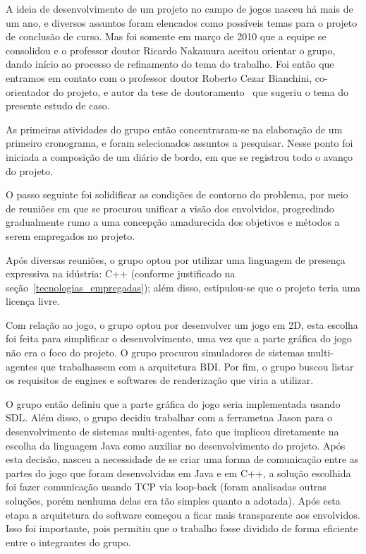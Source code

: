 A ideia de desenvolvimento de um projeto no campo de jogos nasceu há mais de um ano, e diversos assuntos foram elencados como possíveis temas para o projeto de conclusão de curso. Mas foi somente em março de 2010 que a equipe se consolidou e o professor doutor Ricardo Nakamura aceitou orientar o grupo, dando início ao processo de refinamento do tema do trabalho. Foi então que entramos em contato com o professor doutor Roberto Cezar Bianchini, co-orientador do projeto, e autor da tese de doutoramento~\cite{tese_roberto} que sugeriu o tema do presente estudo de caso.  

As primeiras atividades do grupo então concentraram-se na elaboração de um primeiro cronograma, e foram selecionados assuntos a pesquisar. Nesse ponto foi iniciada a composição de um diário de bordo, em que se registrou todo o avanço do projeto.

O passo seguinte foi solidificar as condições de contorno do problema, por meio de reuniões em que se procurou unificar a visão dos envolvidos, progredindo gradualmente rumo a uma concepção amadurecida dos objetivos e métodos a serem empregados no projeto.

Após diversas reuniões, o grupo optou por utilizar uma linguagem de presença expressiva na idústria: C++ (conforme justificado na seção~\ref{tecnologias_empregadas}); além disso, estipulou-se que o projeto teria uma licença livre.

Com relação ao jogo, o grupo optou por desenvolver um jogo em 2D, esta escolha foi feita para simplificar o desenvolvimento, uma vez que a parte gráfica do jogo não era o foco do projeto.
O grupo procurou simuladores de sistemas multi-agentes que trabalhassem com a arquitetura BDI. Por fim, o grupo buscou listar os requisitos de engines e softwares de renderização que viria a utilizar.

O grupo então definiu que a parte gráfica do jogo seria implementada usando SDL. Além disso, o grupo decidiu trabalhar com a ferrametna Jason para o desenvolvimento de sistemas multi-agentes, fato que implicou diretamente na escolha da linguagem Java como auxiliar no desenvolvimento do projeto.
Após esta decisão, nasceu a necessidade de se criar uma forma de comunicação entre as partes do jogo que foram desenvolvidas em Java e em C++, a solução escolhida foi fazer comunicação usando TCP via loop-back (foram analisadas outras soluções, porém nenhuma delas era tão simples quanto a adotada). Após esta etapa a arquitetura do software começou a ficar mais transparente aos envolvidos. Isso foi importante, pois permitiu que o trabalho fosse dividido de forma eficiente entre o integrantes do grupo.

